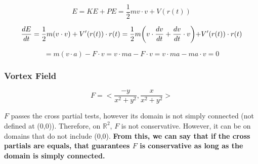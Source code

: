 \documentclass{article}
\begin{document}
$$
E = KE + PE = \frac{1}{2}m v \cdot v + V(r(t))
$$

$$
\frac{dE}{dt} = \frac{1}{2}m (v \cdot v) + V'(r(t)) \cdot r(t) \\ = \frac{1}{2} m  \biggl(v \cdot \frac{dv}{dt} + \frac{dv}{dt} \cdot v \biggl) + V'(r(t)) \cdot r(t)
$$

$$
= m(v \cdot a) - F \cdot v = v \cdot ma - F \cdot v = v \cdot ma - ma \cdot v = 0
$$

\subsubsection{Vortex Field}

$$
F = \biggl<\frac{-y}{x^2 + y^2}, \frac{x}{x^2 + y^2}\biggl>
$$

$F$ passes the cross partial tests, however its domain is not simply connected (not defined at (0,0)). Therefore, on $\mathbb{R}^2$, $F$ is not conservative. However, it can be on domains that do not include (0,0). \textbf{From this, we can say that if the cross partials are equals, that guarantees $F$ is conservative as long as the domain is simply connected.}
\end{document}
